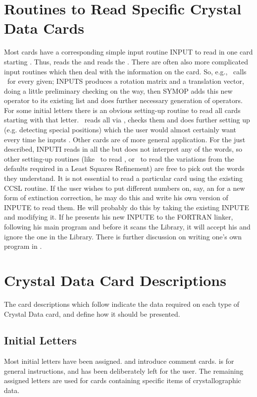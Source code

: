 \section{Routines to Read Specific Crystal Data Cards}
Most cards have a corresponding simple input routine INPUT to read in
one card starting .  Thus,  reads the  and 
 reads
the . There are often also more complicated input routines 
which then deal with the information
on the card.  So, e.g., \ calls \ for 
every  given;
INPUTS produces a rotation matrix and a translation vector,
doing a little preliminary checking on the way, then SYMOP adds this new
operator to its existing list and does further necessary generation of
operators.
\p 
For some initial letters there is an obvious setting-up routine to read
all cards starting with that letter.  \ reads all  via
, checks them and does further setting up (e.g.
detecting special positions) which the user would almost certainly want
every time he inputs .
\p 
Other cards are of more general application.  For the  just
described, INPUTI reads in all the 
\cwns but does not interpret any of the words, so other
setting-up routines (like \ to read , or 
\ to read the
variations from the defaults required in a Least Squares Refinement)
are free to pick out the words they understand.
\p 
It is not essential to read a particular card using the existing CCSL
routine. If the user wishes to put different numbers on, say, an 
for a new form of extinction correction, he may do this and write
his own version of INPUTE to read them. He will probably do
this by taking the existing INPUTE and modifying it. If he presents
his new INPUTE to the FORTRAN linker, following his main program and
before it scans the Library, it will accept his and ignore the one in
the Library. There is further discussion on writing one's own program in
.
\p 
\section{Crystal Data Card Descriptions}
The card descriptions which follow indicate the data required on
each type of Crystal Data card, and define how it should be presented.
\p 
\subsection{Initial Letters}
Most initial letters have been assigned.   and  introduce 
comment cards.  is for general instructions, and  has 
been deliberately left for the user.  The remaining assigned letters are used
for cards containing specific items of crystallographic data.
